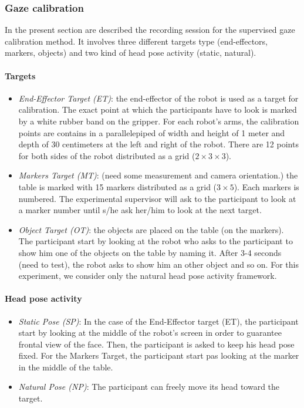 \documentclass[11pt,a4paper]{article}
\begin{document}
\subsubsection{Gaze calibration}
In the present section are described the recording session for the supervised gaze calibration method. It involves three different targets type (end-effectors, markers, objects) and two kind of head pose activity (static, natural).
\paragraph{Targets}
\begin{itemize}
\item \textit{End-Effector Target (ET)}: the end-effector of the robot is used as a target for calibration. The exact point at which the participants have to look is marked by a white rubber band on the gripper. For each robot's arms, the calibration points are contains in a parallelepiped of width and height of 1 meter and depth of 30 centimeters at the left and right of the robot. There are 12 points for both sides of the robot distributed as a grid ($2 \times 3 \times 3$).
\item \textit{Markers Target (MT)}: (need some measurement and camera orientation.) the table is marked with 15 markers distributed as a grid ($3 \times 5$). Each markers is numbered. The experimental supervisor will ask to the participant to look at a marker number until s/he ask her/him to look at the next target.
\item \textit{Object Target (OT)}: the objects are placed on the table (on the markers). The participant start by looking at the robot who asks to the participant to show him one of the objects on the table by naming it. After 3-4 seconds (need to test), the robot asks to show him an other object and so on. For this experiment, we consider only the natural head pose activity framework.
\end{itemize}
\paragraph{Head pose activity}
\begin{itemize}
\item \textit{Static Pose (SP)}: In the case of the End-Effector target (ET), the participant start by looking at the middle of the robot's screen in order to guarantee frontal view of the face. Then, the participant is asked to keep his head pose fixed. For the Markers Target, the participant start pas looking at the marker in the middle of the table.
\item \textit{Natural Pose (NP)}: The participant can freely move its head toward the target.
\end{itemize}
\end{document}
